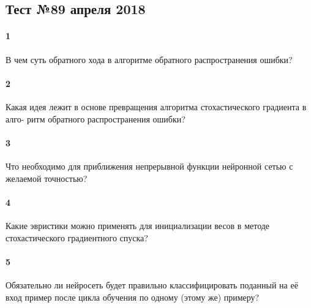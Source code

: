 \documentclass[a4paper,12pt]{article}
\begin{document}
  \subsection*{Тест №8\hfill{9 апреля 2018}}

  \paragraph{1} В чем суть обратного хода в алгоритме обратного распространения ошибки?
  
  \makebox[\linewidth]{\hrulefill}
  \makebox[\linewidth]{\hrulefill}
  \makebox[\linewidth]{\hrulefill}
  \makebox[\linewidth]{\hrulefill}
  
  \paragraph{2} Какая идея лежит в основе превращения алгоритма стохастического градиента в алго-
ритм обратного распространения ошибки?
  
  \makebox[\linewidth]{\hrulefill}
  \makebox[\linewidth]{\hrulefill}
  \makebox[\linewidth]{\hrulefill}
  \makebox[\linewidth]{\hrulefill}

  \paragraph{3} Что необходимо для приближения непрерывной функции нейронной сетью с желаемой
точностью?

  \makebox[\linewidth]{\hrulefill}
  \makebox[\linewidth]{\hrulefill}
  \makebox[\linewidth]{\hrulefill}

  \paragraph{4} Какие эвристики можно применять для инициализации весов в методе стохастического градиентного спуска?
    
  \makebox[\linewidth]{\hrulefill}
  \makebox[\linewidth]{\hrulefill}
  \makebox[\linewidth]{\hrulefill}
  
  \paragraph{5} Обязательно ли нейросеть будет правильно классифицировать поданный на её вход пример после цикла обучения по одному (этому же) примеру?

  \makebox[\linewidth]{\hrulefill}
  \makebox[\linewidth]{\hrulefill}
  \makebox[\linewidth]{\hrulefill}
  \makebox[\linewidth]{\hrulefill}
  
\end{document}
